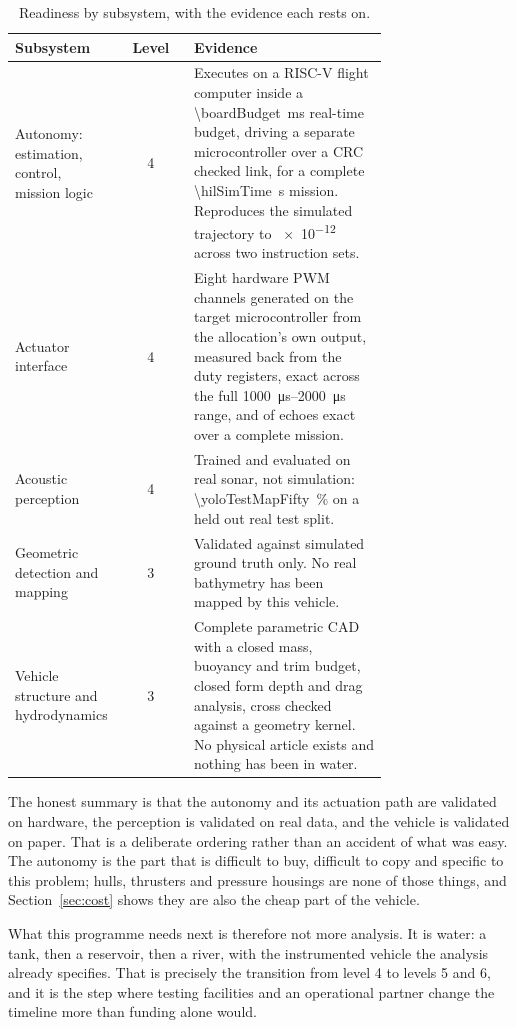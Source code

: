 \documentclass[10pt,a4paper]{article}
\begin{document}
\begin{table}[htbp]\centering\small
\caption{Readiness by subsystem, with the evidence each rests on.}
\begin{tabular}{p{0.22\linewidth}c p{0.52\linewidth}}
\toprule
\textbf{Subsystem} & \textbf{Level} & \textbf{Evidence} \\
\midrule
Autonomy: estimation, control, mission logic & 4 &
Executes on a RISC-V flight computer inside a
\SI{\boardBudget}{\milli\second} real-time budget, driving a separate
microcontroller over a CRC checked link, for a complete
\SI{\hilSimTime}{\second} mission. Reproduces the simulated trajectory to
\num{e-12} across two instruction sets. \\
Actuator interface & 4 &
Eight hardware PWM channels generated on the target microcontroller from the
allocation's own output, measured back from the duty registers, exact across
the full \SIrange{1000}{2000}{\micro\second} range, and \espMatched{} of
\espEchoes{} echoes exact over a complete mission. \\
Acoustic perception & 4 &
Trained and evaluated on real sonar, not simulation: \SI{\yoloTestMapFifty}{\percent}
on a held out real test split. \\
Geometric detection and mapping & 3 &
Validated against simulated ground truth only. No real bathymetry has been
mapped by this vehicle. \\
Vehicle structure and hydrodynamics & 3 &
Complete parametric CAD with a closed mass, buoyancy and trim budget, closed
form depth and drag analysis, cross checked against a geometry kernel. No
physical article exists and nothing has been in water. \\
\bottomrule
\end{tabular}
\end{table}

The honest summary is that the autonomy and its actuation path are validated
on hardware, the perception is validated on real data, and the vehicle is
validated on paper. That is a deliberate ordering rather than an accident of
what was easy. The autonomy is the part that is difficult to buy, difficult to
copy and specific to this problem; hulls, thrusters and pressure housings are
none of those things, and Section~\ref{sec:cost} shows they are also the cheap
part of the vehicle.

What this programme needs next is therefore not more analysis. It is water: a
tank, then a reservoir, then a river, with the instrumented vehicle the
analysis already specifies. That is precisely the transition from level 4 to
levels 5 and 6, and it is the step where testing facilities and an operational
partner change the timeline more than funding alone would.
\end{document}
